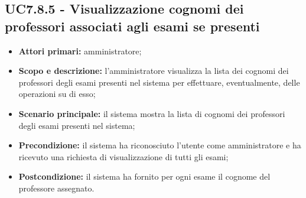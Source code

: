 \documentclass[AnalisiDeiRequisiti.tex]{subfiles}
\begin{document}
\subsection{UC7.8.5 - Visualizzazione cognomi dei professori associati agli esami se presenti}
\begin{itemize}
	\item \textbf{Attori primari:} amministratore;
	\item \textbf{Scopo e descrizione:} l'amministratore visualizza la lista dei cognomi dei professori degli esami presenti nel sistema per effettuare, eventualmente, delle operazioni su di esso;
	\item \textbf{Scenario principale:} il sistema mostra la lista di cognomi dei professori degli esami presenti nel sistema;
	\item \textbf{Precondizione:} il sistema ha riconosciuto l'utente come amministratore e ha ricevuto una richiesta di visualizzazione di tutti gli esami; 
	\item \textbf{Postcondizione:} il sistema ha fornito per ogni esame il cognome del professore assegnato.
\end{itemize}

\end{document}
